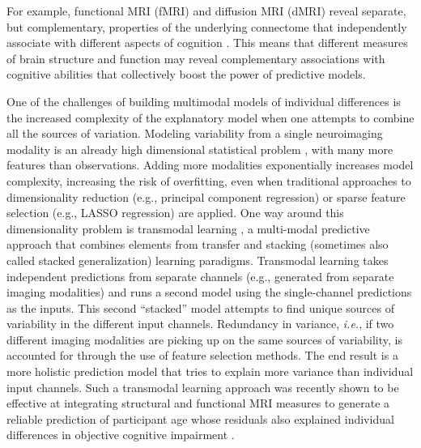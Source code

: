 \documentclass[10pt,letterpaper]{article}
\begin{document}
 For example, functional MRI (fMRI) and diffusion MRI (dMRI) reveal separate, but complementary, properties of the underlying connectome that independently associate with different aspects of cognition \cite{Zimmermann9658}. This means that different measures of brain structure and function may reveal complementary associations with cognitive abilities that collectively boost the power of predictive models.

One of the challenges of building multimodal models of individual differences is the increased complexity of the explanatory model when one attempts to combine all the sources of variation. Modeling variability from a single neuroimaging modality is an already high dimensional statistical problem \cite{DEMARTINO200844, SOTIRAS20151, FRANKE2010883}, with many more features than observations. Adding more modalities exponentially increases model complexity, increasing the risk of overfitting, even when traditional approaches to dimensionality reduction (e.g., principal component regression) or sparse feature selection (e.g., LASSO regression) are applied.  One way around this dimensionality problem is transmodal learning \cite{Rahim2016}, a multi-modal predictive approach that combines elements from transfer \cite{Pan2010} and stacking (sometimes also called stacked generalization) \cite{WOLPERT1992241} learning paradigms. Transmodal learning takes independent predictions from separate channels (e.g., generated from separate imaging modalities) and runs a second model using the single-channel predictions as the inputs. This second ``stacked'' model attempts to find unique sources of variability in the different input channels. Redundancy in variance, {\it i.e.}, if two different imaging modalities are picking up on the same sources of variability, is accounted for through the use of feature selection methods. The end result is a more holistic prediction model that tries to explain more variance than individual input channels. Such a transmodal learning approach was recently shown to be effective at integrating structural and functional MRI measures to generate a reliable prediction of participant age whose residuals also explained individual differences in objective cognitive impairment  \cite{LIEM2017179}. 
\end{document}
